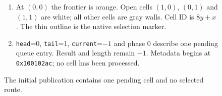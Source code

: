 \begin{figure}[htbp]
\begin{minipage}{\linewidth}
\begin{enumerate}
      \item At $(0,0)$ the frontier is orange. Open cells $(1,0)$, $(0,1)$ and $(1,1)$ are white; all other cells are gray walls. Cell ID is $8y+x$. The thin outline is the native selection marker.
      \item \texttt{head}=0, \texttt{tail}=1, \texttt{current}=$-1$ and phase 0 describe one pending queue entry. Result and length remain $-1$. Metadata begins at \texttt{0x100102ac}; no cell has been processed.
    \end{enumerate}
  \end{minipage}
  \caption{The initial publication contains one pending cell and no selected route.}
  \label{capture:010-maze-explorer-f01-initial}
  \label{maze-f01-initial}
\end{figure}
\par
